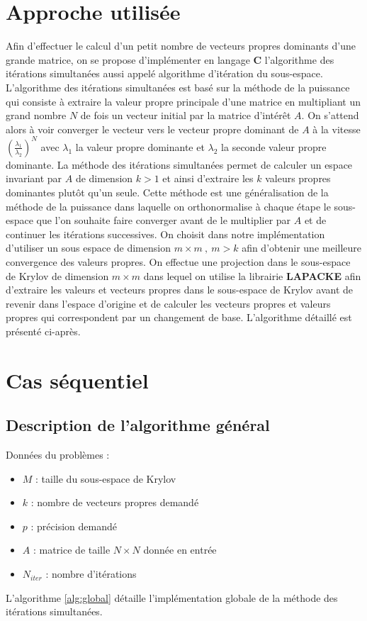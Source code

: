 \documentclass[11pt,a4paper]{article}
\begin{document}
\section{Approche utilisée}
	Afin d'effectuer le calcul d'un petit nombre de vecteurs propres dominants d'une grande matrice, on se propose d'implémenter en langage \textbf{C} l'algorithme des itérations simultanées aussi appelé algorithme d'itération du sous-espace.
	L'algorithme des itérations simultanées est basé sur la méthode de la puissance qui consiste à extraire la valeur propre principale d'une matrice en multipliant un grand nombre $N$ de fois un vecteur initial par la matrice d'intérêt $A$. On s'attend alors à voir converger le vecteur vers le vecteur propre dominant de $A$ à la vitesse $\left(\frac{\lambda_1}{\lambda_2}\right)^N$ avec $\lambda_1$ la valeur propre dominante et $\lambda_2$ la seconde valeur propre dominante.
	La méthode des itérations simultanées permet de calculer un espace invariant par $A$ de dimension $k > 1$ et ainsi d'extraire les $k$ valeurs propres dominantes plutôt qu'un seule. Cette méthode est une généralisation de la méthode de la puissance dans laquelle on orthonormalise à chaque étape le sous-espace que l'on souhaite faire converger avant de le multiplier par $A$ et de continuer les itérations successives. On choisit dans notre implémentation d'utiliser un sous espace de dimension $m\times m\:,\: m > k$ afin d'obtenir une meilleure convergence des valeurs propres. On effectue une projection dans le sous-espace de Krylov de dimension $m\times m$ dans lequel on utilise la librairie \textbf{LAPACKE} afin d'extraire les valeurs et vecteurs propres dans le sous-espace de Krylov avant de revenir dans l'espace d'origine et de calculer les vecteurs propres et valeurs propres qui correspondent par un changement de base. L'algorithme détaillé est présenté ci-après.

\section{Cas séquentiel}

	\subsection{Description de l'algorithme général}

		Données du problèmes :

		\begin{itemize}
			\item $M$ : taille du sous-espace de Krylov
			\item $k$ : nombre de vecteurs propres demandé
			\item $p$ : précision demandé
			\item $A$ : matrice de taille $N\times N$ donnée en entrée
			\item $N_{iter}$ : nombre d'itérations
		\end{itemize}
		\vspace{1cm}
		L'algorithme \ref{alg:global} détaille l'implémentation globale de la méthode des itérations simultanées.
\end{document}

